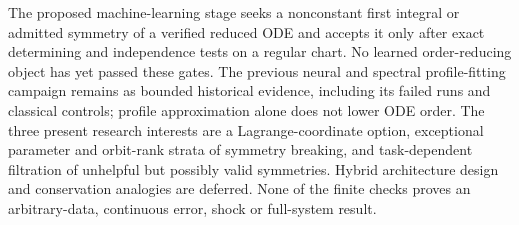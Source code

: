 \documentclass[12pt,a4paper,oneside]{report}
\numberwithin{equation}{chapter}
\begin{document}
The proposed machine-learning stage seeks a nonconstant first integral or
admitted symmetry of a verified reduced ODE and accepts it only after exact
determining and independence tests on a regular chart. No learned
order-reducing object has yet passed these gates. The previous neural and
spectral profile-fitting campaign remains as bounded historical evidence,
including its failed runs and classical controls; profile approximation alone
does not lower ODE order. The three present research interests are a
Lagrange-coordinate option, exceptional parameter and orbit-rank strata of
symmetry breaking, and task-dependent filtration of unhelpful but possibly
valid symmetries. Hybrid architecture design and conservation analogies are
deferred. None of the finite checks proves an arbitrary-data, continuous
error, shock or full-system result.
\end{document}
